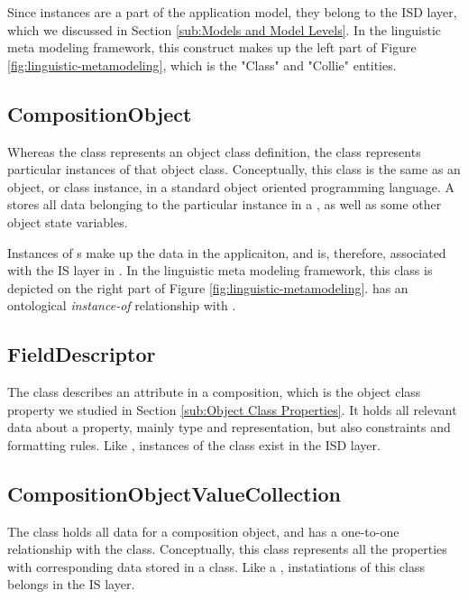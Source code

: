 Since  instances are a part of the application model, they belong to the ISD layer, which we discussed in Section \ref{sub:Models and Model Levels}. In the linguistic meta modeling framework, this construct makes up the left part of Figure \ref{fig:linguistic-metamodeling}, which is the "Class" and "Collie" entities.

\subsection{CompositionObject}
\label{sub:CompositionObject}
Whereas the  class represents an object class definition, the  class represents particular instances of that object class. Conceptually, this class is the same as an object, or class instance, in a standard object oriented programming language. A  stores all data belonging to the particular instance in a , as well as some other object state variables.

Instances of s make up the data in the applicaiton, and is, therefore, associated with the IS layer in \mde. In the linguistic meta modeling framework, this class is depicted on the right part of Figure \ref{fig:linguistic-metamodeling}.  has an ontological \textit{instance-of} relationship with .

\subsection{FieldDescriptor}
\label{sub:FieldDescriptor}
The  class describes an attribute in a composition, which is the object class property we studied in Section \ref{sub:Object Class Properties}. It holds all relevant data about a property, mainly type and representation, but also constraints and formatting rules. Like , instances of the  class exist in the ISD layer.

\subsection{CompositionObjectValueCollection}
\label{sub:CompositionObjectValueCollection}
The  class holds all data for a composition object, and has a one-to-one relationship with the  class. Conceptually, this class represents all the properties with corresponding data stored in a class. Like a , instatiations of this class belongs in the IS layer.


